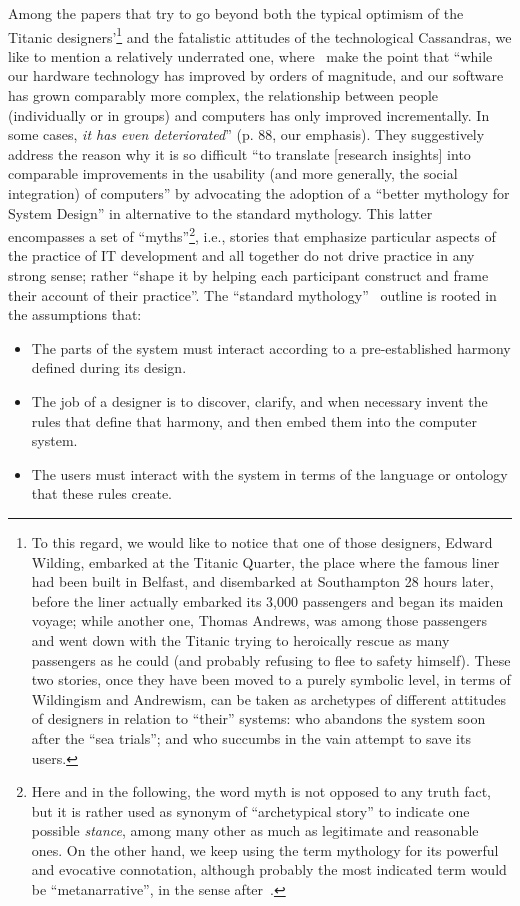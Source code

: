 \documentclass{article}
\let\origquotation\quotation
\let\endorigquotation\endquotation
\renewenvironment{quotation}{\vspace{-0.5\parskip}
  \origquotation
  \footnotesize
}{\endorigquotation}
\begin{document}
Among the papers that try to go beyond both the typical optimism of the Titanic designers'\footnote{To this regard, we would like to notice that one of those designers, Edward Wilding, embarked at the Titanic Quarter, the place where the famous liner had been built in Belfast, and disembarked at Southampton 28 hours later, before the liner actually embarked its 3,000 passengers and began its maiden voyage; while another one, Thomas Andrews, was among those passengers and went down with the Titanic trying to heroically rescue as many passengers as he could (and probably refusing to flee to safety himself). These two stories, once they have been moved to a purely symbolic level, in terms of Wildingism and Andrewism, can be taken as archetypes of different attitudes of designers in relation to ``their'' systems: who abandons the system soon after the ``sea trials''; and who succumbs in the vain attempt to save its users.} and the fatalistic attitudes of the technological Cassandras, we like to mention a relatively underrated one, where~\citet{harris_better_1999} make the point that ``while our hardware technology has improved by orders of magnitude, and our software has grown comparably more complex, the relationship between people (individually or in groups) and computers has only improved incrementally. In some cases, \emph{it has even deteriorated}'' (p. 88, our emphasis). They suggestively address the reason why it is so difficult ``to translate [research insights] into comparable improvements in the usability (and more generally, the social integration) of computers'' by advocating the adoption of a ``better mythology for System Design'' in alternative to the standard mythology. This latter encompasses a set of ``myths''\footnote{Here and in the following, the word myth is not opposed to any truth fact, but it is rather used as synonym of ``archetypical story'' to indicate one possible \emph{stance}, among many other as much as legitimate and reasonable ones. On the other hand, we keep using the term mythology for its powerful and evocative connotation, although probably the most indicated term would be ``metanarrative'', in the sense after~\citet{lyotard_postmodern_1986}.}, i.e., stories that emphasize particular aspects of the practice of IT development and all together do not drive practice in any strong sense; rather ``shape it by helping each participant construct and frame their account of their practice''. The ``standard mythology''~\citet{harris_better_1999} outline is rooted in the assumptions that:

\begin{quotation}
\begin{itemize}
\item The parts of the system must interact according to a pre-established harmony defined during its design.
\item The job of a designer is to discover, clarify, and when necessary invent the rules that define that harmony, and then embed them into the computer system.
\item The users must interact with the system in terms of the language or ontology that these rules create.
\end{itemize}
\end{quotation}
\end{document}
